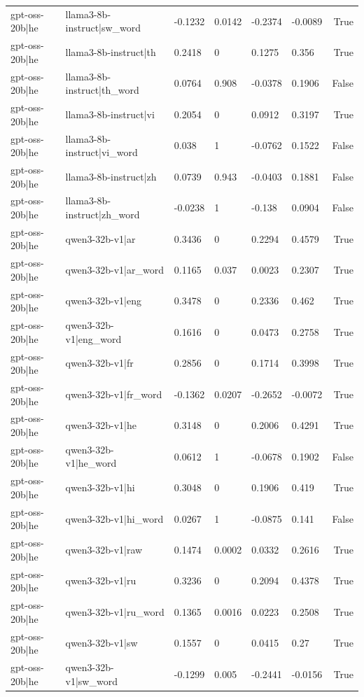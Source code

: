 \begin{table}
\begin{tabular}{llllllr}
gpt-oss-20b|he & llama3-8b-instruct|sw_word & -0.1232 & 0.0142 & -0.2374 & -0.0089 & True \\
gpt-oss-20b|he & llama3-8b-instruct|th & 0.2418 & 0 & 0.1275 & 0.356 & True \\
gpt-oss-20b|he & llama3-8b-instruct|th_word & 0.0764 & 0.908 & -0.0378 & 0.1906 & False \\
gpt-oss-20b|he & llama3-8b-instruct|vi & 0.2054 & 0 & 0.0912 & 0.3197 & True \\
gpt-oss-20b|he & llama3-8b-instruct|vi_word & 0.038 & 1 & -0.0762 & 0.1522 & False \\
gpt-oss-20b|he & llama3-8b-instruct|zh & 0.0739 & 0.943 & -0.0403 & 0.1881 & False \\
gpt-oss-20b|he & llama3-8b-instruct|zh_word & -0.0238 & 1 & -0.138 & 0.0904 & False \\
gpt-oss-20b|he & qwen3-32b-v1|ar & 0.3436 & 0 & 0.2294 & 0.4579 & True \\
gpt-oss-20b|he & qwen3-32b-v1|ar_word & 0.1165 & 0.037 & 0.0023 & 0.2307 & True \\
gpt-oss-20b|he & qwen3-32b-v1|eng & 0.3478 & 0 & 0.2336 & 0.462 & True \\
gpt-oss-20b|he & qwen3-32b-v1|eng_word & 0.1616 & 0 & 0.0473 & 0.2758 & True \\
gpt-oss-20b|he & qwen3-32b-v1|fr & 0.2856 & 0 & 0.1714 & 0.3998 & True \\
gpt-oss-20b|he & qwen3-32b-v1|fr_word & -0.1362 & 0.0207 & -0.2652 & -0.0072 & True \\
gpt-oss-20b|he & qwen3-32b-v1|he & 0.3148 & 0 & 0.2006 & 0.4291 & True \\
gpt-oss-20b|he & qwen3-32b-v1|he_word & 0.0612 & 1 & -0.0678 & 0.1902 & False \\
gpt-oss-20b|he & qwen3-32b-v1|hi & 0.3048 & 0 & 0.1906 & 0.419 & True \\
gpt-oss-20b|he & qwen3-32b-v1|hi_word & 0.0267 & 1 & -0.0875 & 0.141 & False \\
gpt-oss-20b|he & qwen3-32b-v1|raw & 0.1474 & 0.0002 & 0.0332 & 0.2616 & True \\
gpt-oss-20b|he & qwen3-32b-v1|ru & 0.3236 & 0 & 0.2094 & 0.4378 & True \\
gpt-oss-20b|he & qwen3-32b-v1|ru_word & 0.1365 & 0.0016 & 0.0223 & 0.2508 & True \\
gpt-oss-20b|he & qwen3-32b-v1|sw & 0.1557 & 0 & 0.0415 & 0.27 & True \\
gpt-oss-20b|he & qwen3-32b-v1|sw_word & -0.1299 & 0.005 & -0.2441 & -0.0156 & True \\

\end{tabular}
\end{table}
